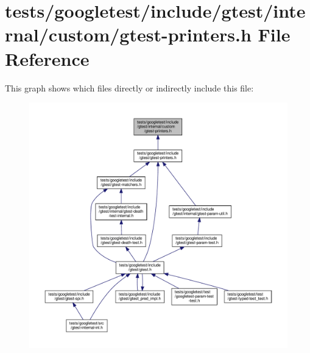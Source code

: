\hypertarget{internal_2custom_2gtest-printers_8h}{}\section{tests/googletest/include/gtest/internal/custom/gtest-\/printers.h File Reference}
\label{internal_2custom_2gtest-printers_8h}
This graph shows which files directly or indirectly include this file\+:\nopagebreak
\begin{figure}[H]
\begin{center}
\leavevmode
\includegraphics[width=350pt]{internal_2custom_2gtest-printers_8h__dep__incl}
\end{center}
\end{figure}
